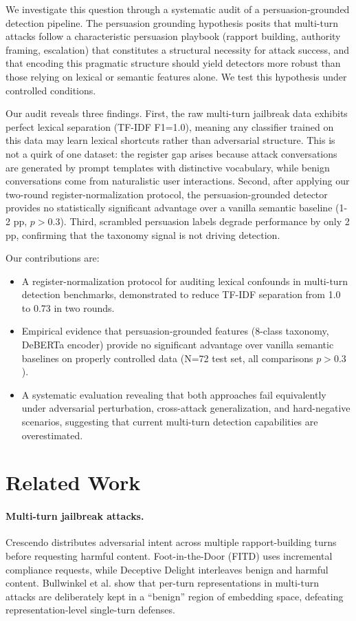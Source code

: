 \documentclass[11pt]{article}
\begin{document}
We investigate this question through a systematic audit of a persuasion-grounded detection pipeline. The persuasion grounding hypothesis posits that multi-turn attacks follow a characteristic persuasion playbook (rapport building, authority framing, escalation) that constitutes a structural necessity for attack success, and that encoding this pragmatic structure should yield detectors more robust than those relying on lexical or semantic features alone. We test this hypothesis under controlled conditions.

Our audit reveals three findings. First, the raw multi-turn jailbreak data exhibits perfect lexical separation (TF-IDF F1=1.0), meaning any classifier trained on this data may learn lexical shortcuts rather than adversarial structure. This is not a quirk of one dataset: the register gap arises because attack conversations are generated by prompt templates with distinctive vocabulary, while benign conversations come from naturalistic user interactions. Second, after applying our two-round register-normalization protocol, the persuasion-grounded detector provides no statistically significant advantage over a vanilla semantic baseline (1-2 pp, $p>0.3$). Third, scrambled persuasion labels degrade performance by only 2 pp, confirming that the taxonomy signal is not driving detection.

Our contributions are:
\begin{itemize}
\item A register-normalization protocol for auditing lexical confounds in multi-turn detection benchmarks, demonstrated to reduce TF-IDF separation from 1.0 to 0.73 in two rounds.
\item Empirical evidence that persuasion-grounded features (8-class taxonomy, DeBERTa encoder) provide no significant advantage over vanilla semantic baselines on properly controlled data (N=72 test set, all comparisons $p>0.3$).
\item A systematic evaluation revealing that both approaches fail equivalently under adversarial perturbation, cross-attack generalization, and hard-negative scenarios, suggesting that current multi-turn detection capabilities are overestimated.
\end{itemize}

\section{Related Work}

\paragraph{Multi-turn jailbreak attacks.}
Crescendo distributes adversarial intent across multiple rapport-building turns before requesting harmful content. Foot-in-the-Door (FITD) uses incremental compliance requests, while Deceptive Delight interleaves benign and harmful content. Bullwinkel et al. show that per-turn representations in multi-turn attacks are deliberately kept in a ``benign'' region of embedding space, defeating representation-level single-turn defenses.
\end{document}
